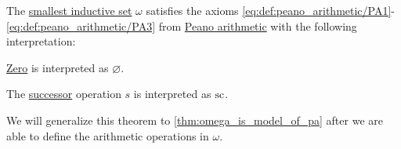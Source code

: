 \begin{theorem}\label{thm:omega_is_model_of_pa_without_operations}
  The \hyperref[thm:smallest_inductive_set_existence]{smallest inductive set} \( \omega \) satisfies the axioms \eqref{eq:def:peano_arithmetic/PA1}-\eqref{eq:def:peano_arithmetic/PA3} from \hyperref[def:peano_arithmetic]{Peano arithmetic} with the following interpretation:
  \begin{thmenum}
     \hyperref[def:peano_arithmetic/zero]{Zero} is interpreted as \( \varnothing \).

     The \hyperref[def:peano_arithmetic/succ]{successor} operation \( s \) is interpreted as \( \op{sc} \).
  \end{thmenum}

  We will generalize this theorem to \cref{thm:omega_is_model_of_pa} after we are able to define the arithmetic operations in \( \omega \).
\end{theorem}
